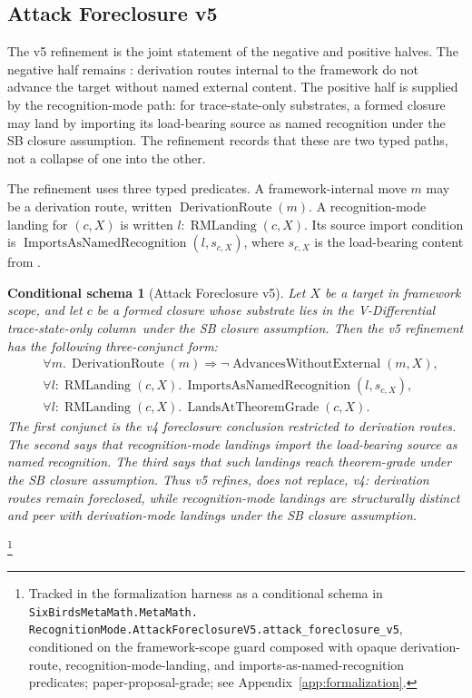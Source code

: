 \documentclass[11pt]{article}
\newcommand{\VDTSO}{V-Differential trace-state-only column}
\newtheorem{schema}[theorem]{Conditional schema}
\theoremstyle{definition}
\begin{document}
\subsection{Attack Foreclosure v5}\label{sec:recognition:attack-foreclosure-v5}

The v5 refinement is the joint statement of the negative and positive
halves. The negative half remains :
derivation routes internal to the framework do not advance the target
without named external content. The positive half is supplied by the
recognition-mode path: for trace-state-only substrates, a formed closure
may land by importing its load-bearing source as named recognition under
the SB closure assumption. The refinement records that these are two
typed paths, not a collapse of one into the other.

The refinement uses three typed predicates.  A framework-internal move
\(m\) may be a derivation route, written
\(\operatorname{DerivationRoute}(m)\).  A recognition-mode landing for
\((c,X)\) is written \(l:\operatorname{RMLanding}(c,X)\).  Its source
import condition is
\(\operatorname{ImportsAsNamedRecognition}(l,s_{c,X})\), where
\(s_{c,X}\) is the load-bearing content from
.

\begin{schema}[Attack Foreclosure v5]\label{thm:attack-foreclosure-v5}
Let \(X\) be a target in framework scope, and let \(c\) be a formed
closure whose substrate lies in the \VDTSO\ under the SB closure
assumption.  Then the v5 refinement has the following three-conjunct
form:
\[
\begin{aligned}
  &\forall m.\,
    \operatorname{DerivationRoute}(m)
    \Longrightarrow
    \neg\operatorname{AdvancesWithoutExternal}(m,X),\\
  &\forall l:\operatorname{RMLanding}(c,X).\,
    \operatorname{ImportsAsNamedRecognition}(l,s_{c,X}),\\
  &\forall l:\operatorname{RMLanding}(c,X).\,
    \operatorname{LandsAtTheoremGrade}(c,X).
\end{aligned}
\]
The first conjunct is the v4 foreclosure conclusion restricted to
derivation routes.  The second says that recognition-mode landings
import the load-bearing source as named recognition.  The third says
that such landings reach theorem-grade under the SB closure assumption.
Thus v5 refines, does not replace, v4: derivation routes remain
foreclosed, while recognition-mode landings are structurally distinct
and peer with derivation-mode landings under the SB closure assumption.
\end{schema}\footnote{\raggedright Tracked in the formalization
harness as a conditional schema in
\texttt{SixBirdsMetaMath.MetaMath.\allowbreak
RecognitionMode.AttackForeclosureV5.\allowbreak attack\_foreclosure\_v5},
conditioned on the framework-scope guard composed with opaque
derivation-route, recognition-mode-landing, and
imports-as-named-recognition predicates; paper-proposal-grade; see
Appendix~\ref{app:formalization}.}
\end{document}
